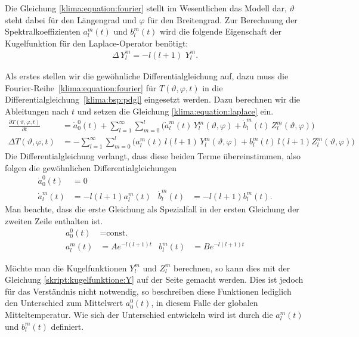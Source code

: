 \begin{refsection}
Die Gleichung \eqref{klima:equation:fourier} stellt im Wesentlichen das Modell dar, $\vartheta$ steht dabei für den Längengrad und $\varphi$ für den Breitengrad. Zur Berechnung der Spektralkoeffizienten $a^m_l(t)$ und $b^m_l(t)$ wird die folgende Eigenschaft der Kugelfunktion für den Laplace-Operator benötigt:
\begin{align}
\Delta \,Y^m_l=-l(l+1)\,\,Y^m_l.
\label{klima:equation:laplace}
\end{align}

Als erstes stellen wir die gewöhnliche Differentialgleichung auf, dazu muss die Fourier-Reihe~\eqref{klima:equation:fourier} für $T(\vartheta ,\varphi ,t)$ in die Differentialgleichung~\eqref{klima:bsp:pdgl} eingesetzt werden.
Dazu berechnen wir die Ableitungen nach $t$ und setzen die Gleichung \eqref{klima:equation:laplace} ein.
\begin{align*}
\frac{\partial T(\vartheta ,\varphi ,t)}{\partial t} &=
\dot{a}^0_0(t)+\sum_{l=1}^\infty\sum_{m=0}^l \bigl( \dot{a}^m_l(t)\,Y^m_l(\vartheta ,\varphi)+\dot{b}^m_l(t)\,Z^m_l(\vartheta ,\varphi)\bigr)
\\
\Delta T(\vartheta ,\varphi ,t) &=
- \sum_{l=1}^\infty\sum_{m=0}^l \bigl( a^m_l(t)\,l(l+1)\,Y^m_l(\vartheta ,\varphi)+b^m_l(t)\,l(l+1)Z^m_l(\vartheta ,\varphi)\bigr)
\end{align*}
Die Differentialgleichung verlangt, dass diese beiden Terme übereinstimmen, also folgen die gewöhnlichen Differentialgleichungen
\begin{align*}
\dot a^0_0(t)&= 0
\\
\dot a^m_l(t)&=-l(l+1)a^m_l(t)&
\dot b^m_l(t)&=-l(l+1)b^m_l(t).
\end{align*}
Man beachte, dass die erste Gleichung als Spezialfall in der ersten
Gleichung der zweiten Zeile enthalten ist.
\begin{align*}
a^0_0(t)&=\text{const.}
\\
a^m_l(t) &=Ae^{-l(l+1)t}&
b^m_l(t) &=Be^{-l(l+1)t}
\end{align*}

Möchte man die Kugelfunktionen $Y^m_l$ und $Z^m_l$ berechnen, so kann dies mit der Gleichung \eqref{skript:kugelfunktione:Y} auf der Seite \pageref{skript:kugelfunktione:Y} gemacht werden. Dies ist jedoch für das Verständnis nicht notwendig, so beschreiben diese Funktionen lediglich den Unterschied zum Mittelwert $a^0_0(t)$, in diesem Falle der globalen Mitteltemperatur. Wie sich der Unterschied entwickeln wird ist durch die $a^m_l(t)$ und $b^m_l(t)$ definiert.


\end{refsection}
